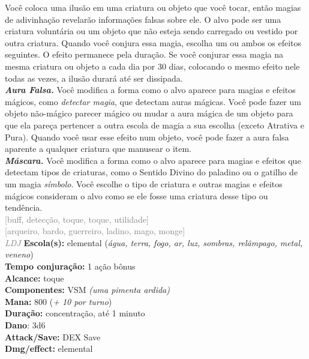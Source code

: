 \documentclass{RPG_Adventure}[2021/10/20]
\begin{document}
{\normalsize Você coloca uma ilusão em uma criatura ou objeto que você tocar, então magias de adivinhação revelarão informações falsas sobre ele. O alvo pode ser uma criatura voluntária ou um objeto que não esteja sendo carregado ou vestido por outra criatura.  Quando você conjura essa magia, escolha um ou ambos os efeitos seguintes. O efeito permanece pela duração. Se você conjurar essa magia na mesma criatura ou objeto a cada dia por 30 dias, colocando o mesmo efeito nele todas as vezes, a ilusão durará até ser dissipada.\\\t \textbf{\textit{Aura Falsa.}} Você modifica a forma como o alvo aparece para magias e efeitos mágicos, como \textit{detectar magia}, que detectam auras mágicas. Você pode fazer um objeto não-mágico parecer mágico ou mudar a aura mágica de um objeto para que ela pareça pertencer a outra escola de magia a sua escolha (exceto Atrativa e Pura). Quando você usar esse efeito num objeto, você pode fazer a aura falsa aparente a qualquer criatura que manusear o item.\\\t \textbf{\textit{Máscara.}} Você modifica a forma como o alvo aparece para magias e efeitos que detectam tipos de criaturas, como o Sentido Divino do paladino ou o gatilho de um magia \textit{símbolo}. Você escolhe o tipo de criatura e outras magias e efeitos mágicos consideram o alvo como se ele fosse uma criatura desse tipo ou tendência.\\}
{\scriptsize \textcolor{gray}{[buff, detecção, toque, toque, utilidade]\\}}
{\scriptsize \textcolor{gray}{[arqueiro, bardo, guerreiro, ladino, mago, monge]\\}}
{\tiny \textcolor{gray}{\textit{LDJ}}}
{\small \t \textbf{Escola(s):} elemental (\textit{água, terra, fogo, ar, luz, sombras, relâmpago, metal, veneno})\\\t \textbf{Tempo conjuração:} 1 ação bônus\\\t \textbf{Alcance:} toque\\\t \textbf{Componentes:} VSM \textit{(uma pimenta ardida)}\\\t \textbf{Mana:} 800 (\textit{+ 10 por turno})\\\t \textbf{Duração:} concentração, até 1 minuto\\\t \textbf{Dano}: 3d6\\\t \textbf{Attack/Save:} DEX Save\\\t \textbf{Dmg/effect:} elemental\\}
\end{document}
